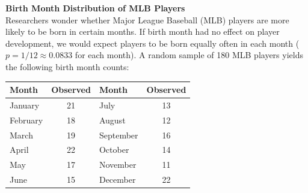 \documentclass[10pt]{article}
\begin{document}
\namepartnerperiod

\vspace{0.05in}

\begin{tcolorbox}[colback=sky!30, colframe=navy, boxrule=0.8pt, arc=2mm,
    left=3mm, right=3mm, top=2mm, bottom=2mm]
\textbf{Birth Month Distribution of MLB Players}\\[4pt]
Researchers wonder whether Major League Baseball (MLB) players are more likely to be born
in certain months. If birth month had no effect on player development, we would expect
players to be born equally often in each month ($p = 1/12 \approx 0.0833$ for each month).
A random sample of 180 MLB players yields the following birth month counts:

\renewcommand{\arraystretch}{1.4}
\begin{center}
\begin{tabular}{lc|lc}
    \textbf{Month} & \textbf{Observed} & \textbf{Month} & \textbf{Observed} \\
    \hline
    January   & 21 & July      & 13 \\
    February  & 18 & August    & 12 \\
    March     & 19 & September & 16 \\
    April     & 22 & October   & 14 \\
    May       & 17 & November  & 11 \\
    June      & 15 & December  & 22 \\
\end{tabular}
\end{center}
\end{tcolorbox}

\vspace{0.08in}
\end{document}
